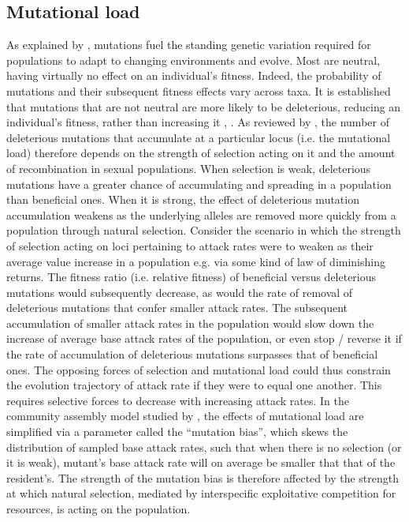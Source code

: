 \documentclass[a4paper]{report}
\begin{document}
\subsection{Mutational load \label{sec:Mutational_load}} As explained by \citep{Eyre-walker2007}, mutations fuel the standing genetic variation required for populations to adapt to changing environments and evolve. Most are neutral, having virtually no effect on an individual’s fitness. Indeed, the probability of mutations and their subsequent fitness effects vary across taxa. It is established that mutations that are not neutral are more likely to be deleterious, reducing an individual’s fitness, rather than increasing it \citep{Eyre-walker2007}, \citep{Agrawal2012}. As reviewed by \citep{Agrawal2012}, the number of deleterious mutations that accumulate at a particular locus (i.e. the mutational load) therefore depends on the strength of selection acting on it and the amount of recombination in sexual populations. When selection is weak, deleterious mutations have a greater chance of accumulating and spreading in a population than beneficial ones. When it is strong, the effect of deleterious mutation accumulation weakens as the underlying alleles are removed more quickly from a population through natural selection. Consider the scenario in which the strength of selection acting on loci pertaining to attack rates were to weaken as their average value increase in a population e.g. via some kind of law of diminishing returns. The fitness ratio (i.e. relative fitness) of beneficial versus deleterious mutations would subsequently decrease, as would the rate of removal of deleterious mutations that confer smaller attack rates. The subsequent accumulation of smaller attack rates in the population would slow down the increase of average base attack rates of the population, or even stop / reverse it if the rate of accumulation of deleterious mutations surpasses that of beneficial ones. The opposing forces of selection and mutational load could thus constrain the evolution trajectory of attack rate if they were to equal one another. This requires selective forces to decrease with increasing attack rates. In the community assembly model studied by \citep{Rossberg2013}, the effects of mutational load are simplified via a parameter called the “mutation bias”, which skews the distribution of sampled base attack rates, such that when there is no selection (or it is weak), mutant’s base attack rate will on average be smaller that that of the resident's. The strength of the mutation bias is therefore affected by the strength at which natural selection, mediated by interspecific exploitative competition for resources, is acting on the population.
\end{document}

